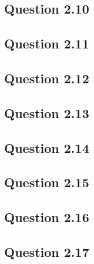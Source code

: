 \documentclass{article}
\begin{document}
\subsection*{Question 2.10}




\subsection*{Question 2.11}



\subsection*{Question 2.12}


\subsection*{Question 2.13}


\subsection*{Question 2.14}


\subsection*{Question 2.15}


\subsection*{Question 2.16}


\subsection*{Question 2.17}
\end{document}
